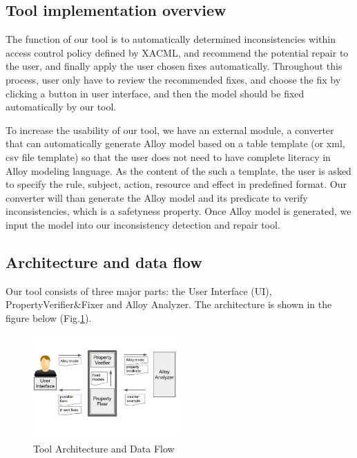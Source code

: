 \documentclass{acm_proc_article-sp}
\begin{document}
\subsection{Tool implementation overview}
The function of our tool is to automatically determined inconsistencies within access control policy defined by XACML, and recommend the potential repair to the user, and finally apply the user chosen fixes automatically. Throughout this process, user only have to review the recommended fixes, and choose the fix by clicking a button in user interface, and then the model should be fixed automatically by our tool. 

To increase the usability of our tool, we have an external module, a converter that can automatically generate Alloy model based on a table template (or xml, csv file template) so that the user does not need to have complete literacy in Alloy modeling language. As the content of the such a template, the user is asked to specify the rule, subject, action, resource and effect in predefined format. Our converter will than generate the Alloy model and its predicate to verify inconsistencies, which is a safetyness property. Once Alloy model is generated, we input the model into our inconsistency detection and repair tool. 

\subsection{Architecture and data flow}

Our tool consists of three major parts: the User Interface (UI), PropertyVerifier\&Fixer and Alloy Analyzer. The architecture is shown in the figure below (Fig.\ref{fig:Architecture}).\\

\begin{figure}[h]
\includegraphics[width=0.5\textwidth]{DataFlow.JPG}
\caption{Tool Architecture and Data Flow}    
  \label{fig:Architecture}
\end{figure}
\end{document}
